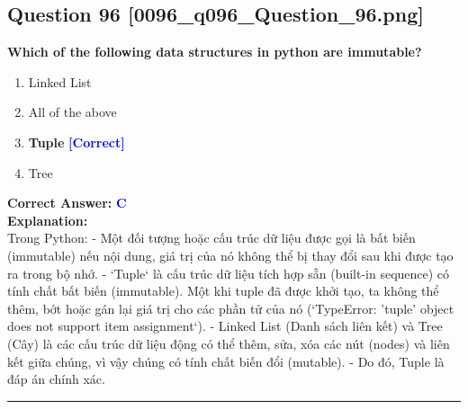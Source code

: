 \documentclass[11pt,a4paper]{article}
\begin{document}
\begin{minipage}{\textwidth}
\subsection*{Question 96 \quad \footnotesize{[0096_q096_Question_96.png]}}
\noindent \textbf{Which of the following data structures in python are immutable?}

\begin{enumerate}[label=\Alph*.]
    \item Linked List
    \item All of the above
    \item \textbf{Tuple} \hfill \textcolor{blue}{\textbf{[Correct]}}
    \item Tree
\end{enumerate}

\noindent \textbf{Correct Answer:} \textcolor{blue}{\textbf{C}} \\[4pt]
\noindent \textbf{Explanation:}\\
Trong Python:\newline
- Một đối tượng hoặc cấu trúc dữ liệu được gọi là bất biến (immutable) nếu nội dung, giá trị của nó không thể bị thay đổi sau khi được tạo ra trong bộ nhớ.\newline
- `Tuple` là cấu trúc dữ liệu tích hợp sẵn (built-in sequence) có tính chất bất biến (immutable). Một khi tuple đã được khởi tạo, ta không thể thêm, bớt hoặc gán lại giá trị cho các phần tử của nó (`TypeError: 'tuple' object does not support item assignment`).\newline
- Linked List (Danh sách liên kết) và Tree (Cây) là các cấu trúc dữ liệu động có thể thêm, sửa, xóa các nút (nodes) và liên kết giữa chúng, vì vậy chúng có tính chất biến đổi (mutable).\newline
- Do đó, Tuple là đáp án chính xác.
\end{minipage}
\vspace{0.8cm}
\hrule
\vspace{0.5cm}
\end{document}

